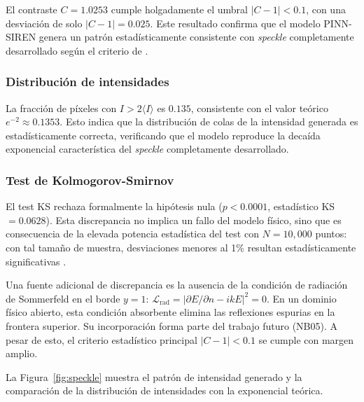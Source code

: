 El contraste $C = 1.0253$ cumple holgadamente el umbral $|C - 1| < 0.1$, con
una desviación de solo $|C - 1| = 0.025$. Este resultado confirma que el modelo
PINN-SIREN genera un patrón estadísticamente consistente con \textit{speckle}
completamente desarrollado según el criterio de \textcite{goodman2007speckle}.

\subsubsection{Distribución de intensidades}

La fracción de píxeles con $I > 2\langle I \rangle$ es $0.135$, consistente con
el valor teórico $e^{-2} \approx 0.1353$. Esto indica que la distribución de
colas de la intensidad generada es estadísticamente correcta, verificando que el
modelo reproduce la decaída exponencial característica del \textit{speckle}
completamente desarrollado.

\subsubsection{Test de Kolmogorov-Smirnov}

El test KS rechaza formalmente la hipótesis nula ($p < 0.0001$, estadístico
KS $= 0.0628$). Esta discrepancia no implica un fallo del modelo físico, sino
que es consecuencia de la elevada potencia estadística del test con
$N = 10{,}000$ puntos: con tal tamaño de muestra, desviaciones menores al 1\%
resultan estadísticamente significativas \parencite{goodman2007speckle}.

Una fuente adicional de discrepancia es la ausencia de la condición de radiación
de Sommerfeld en el borde $y = 1$:
$\mathcal{L}_\text{rad} = |\partial E/\partial n - ikE|^2 = 0$.
En un dominio físico abierto, esta condición absorbente elimina las reflexiones
espurias en la frontera superior. Su incorporación forma parte del trabajo futuro
(NB05). A pesar de esto, el criterio estadístico principal $|C - 1| < 0.1$ se
cumple con margen amplio.

La Figura~\ref{fig:speckle} muestra el patrón de intensidad generado y la
comparación de la distribución de intensidades con la exponencial teórica.

